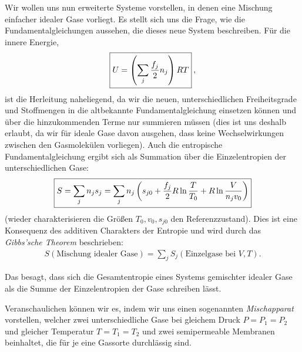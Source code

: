 Wir wollen uns nun erweiterte Systeme vorstellen, in denen eine Mischung einfacher idealer Gase vorliegt. Es stellt sich uns die Frage, wie die Fundamentalgleichungen aussehen, die dieses neue System beschreiben. Für die innere Energie,
\begin{align*}
    \boxed{U=\left(\sum_j\frac{f_j}{2}n _j\right)RT}\:,
\end{align*}
ist die Herleitung naheliegend, da wir die neuen, unterschiedlichen Freiheitsgrade und Stoffmengen in die altbekannte Fundamentalgleichung einsetzen können und über die hinzukommenden Terme nur summieren müssen (dies ist uns deshalb erlaubt, da wir für ideale Gase davon ausgehen, dass keine Wechselwirkungen zwischen den Gasmolekülen vorliegen). Auch die entropische Fundamentalgleichung ergibt sich als Summation über die Einzelentropien der unterschiedlichen Gase:
\begin{align*}
    \boxed{S=\sum_jn _js_j=\sum_jn _j\left(s_{j0}+\frac{f_j}{2}R\ln\frac{T}{T_0}+R\ln\frac{V}{n _jv_0}\right)}
\end{align*}
(wieder charakterisieren die Größen $T_0,v_0,s_{j0}$ den Referenzzustand).
Dies ist eine Konsequenz des additiven Charakters der Entropie und wird durch das \emph{Gibbs'sche Theorem} beschrieben:
\begin{align*}
    \boxed{S(\text{Mischung idealer Gase})=\sum_jS_j(\text{Einzelgase bei } V,T)}.
\end{align*}
\begin{formal}
    Das  besagt, dass sich die Gesamtentropie eines Systems gemischter idealer Gase als die Summe der Einzelentropien der Gase schreiben lässt.
\end{formal}
Veranschaulichen können wir es, indem wir uns einen sogenannten \emph{Mischapparat} vorstellen, welcher zwei unterschiedliche Gase bei gleichem Druck $P=P_1=P_2$ und gleicher Temperatur $T=T_1=T_2$ und zwei semipermeable Membranen beinhaltet, die für je eine Gassorte durchlässig sind. 

